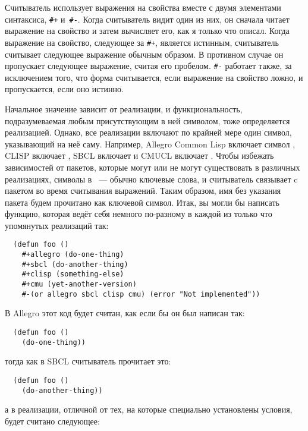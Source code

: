 Считыватель использует выражения на свойства вместе с двумя элементами синтаксиса,
\lstinline!#+! и~\lstinline!#-!. Когда считыватель видит один из них, он сначала читает
выражение на свойство и затем вычисляет его, как я только что описал. Когда выражение на
свойство, следующее за \lstinline!#+!, является истинным, считыватель считывает следующее
выражение обычным образом. В противном случае он пропускает следующее выражение, считая
его пробелом. \lstinline!#-! работает также, за исключением того, что форма считывается,
если выражение на свойство ложно, и пропускается, если оно истинно.

Начальное значение  зависит от реализации, и функциональность,
подразумеваемая любым присутствующим в ней символом, тоже определяется
реализацией. Однако, все реализации включают по крайней мере один символ, указывающий на
неё саму. Например, Allegro Common Lisp включает символ , CLISP включает
, SBCL включает  и CMUCL включает . Чтобы избежать
зависимостей от пакетов, которые могут или не могут существовать в различных реализациях,
символы в ~--- обычно ключевые слова, и считыватель связывает
 c пакетом  во время считывания выражений. Таким образом,
имя без указания пакета будем прочитано как ключевой символ. Итак, вы могли бы написать
функцию, которая ведёт себя немного по-разному в каждой из только что упомянутых
реализаций так:

\begin{lstlisting}
  (defun foo ()
    #+allegro (do-one-thing)
    #+sbcl (do-another-thing)
    #+clisp (something-else)
    #+cmu (yet-another-version)
    #-(or allegro sbcl clisp cmu) (error "Not implemented"))
\end{lstlisting}

В Allegro этот код будет считан, как если бы он был написан так:

\begin{lstlisting}
  (defun foo ()
    (do-one-thing))
\end{lstlisting}

тогда как в SBCL считыватель прочитает это:

\begin{lstlisting}
  (defun foo ()
    (do-another-thing))
\end{lstlisting}

а в реализации, отличной от тех, на которые специально установлены условия, будет считано
следующее:

